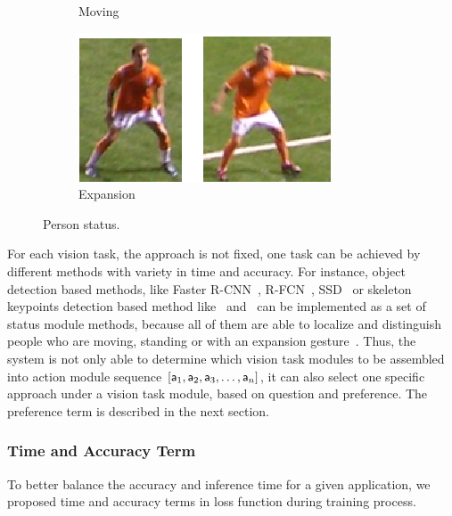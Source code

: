 {\begin{figure}[thb]
\begin{subfigure}[b]{0.127\textwidth}
                \caption{Moving}
                \label{fig:gull2}
        \end{subfigure}\quad
        \begin{subfigure}[b]{0.166\textwidth}
                \includegraphics[width=\linewidth]{figures/expand1.eps}
                \caption{Expansion}
                \label{fig:tiger}
        \end{subfigure}
        \caption{Person status.}\label{fig:Person Status}
\end{figure}
}



For each vision task, the approach is not fixed, one task can be achieved by different methods with variety in time and accuracy. For instance, object detection based methods, like Faster R-CNN~\cite{Ren:2015:FRT:2969239.2969250}, R-FCN~\cite{DBLP:conf/nips/DaiLHS16}, SSD~\cite{DBLP:conf/eccv/LiuAESRFB16} or skeleton keypoints detection based method like~\cite{cao2017realtime} and~\cite{wei2016cpm} can be implemented as a set of status module methods, because all of them are able to localize and distinguish people who are moving, standing or with an expansion gesture~\cite{peixi2019}. %
Thus, the system is not only able to determine which vision task modules to be assembled into action module sequence $[{\mathsf{a}}_1,{\mathsf{a}}_2,{\mathsf{a}}_3,\dots,{\mathsf{a}}_n]$, it can also select one specific approach under a vision task module, based on question and preference. The preference term is described in the next section. 


\subsubsection{Time and Accuracy Term}
\label{sec-TimeAcc}
\hspace{\parindent} To better balance the accuracy and inference time for a given application, we proposed time and accuracy terms in loss function during training process.

